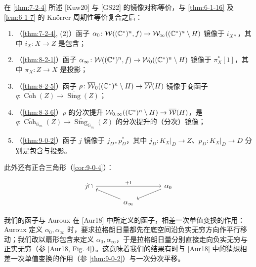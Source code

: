 \begin{thmstar}
在 \ref{thm:7-2-4} 所述 [Kuw20] 与 [GS22] 的镜像对称等价，与 \ref{thm:6-1-16} 及 \ref{lem:6-1-7} 的 Kn{\"o}rrer 周期性等价复合之后：
\begin{enumerate}
\item （\ref{thm:7-2-4}, (2)）函子 $\alpha_0\colon\mathcal{W}((\mathbb{C}^*)^n,f)\to\mathcal{W}_\infty((\mathbb{C}^*)^n\setminus H)$ 镜像于 $i_{X*}$，其中 $i_X\colon X\to Z$ 是包含；
\item （\ref{thm:8-2-1}）函子 $\alpha_\infty\colon\mathcal{W}((\mathbb{C}^*)^n,f)\to\mathcal{W}_0((\mathbb{C}^*)^n\setminus H)$ 镜像于 $\pi_X^*[1]$，其中 $\pi_X\colon Z\to X$ 是投影；
\item （\ref{thm:8-2-5}）函子 $\rho\colon\overline{\mathcal{W}}_0((\mathbb{C}^*)^n\setminus H)\to\overline{\mathcal{W}}(H)$ 镜像于商函子 $q\colon\overline{\operatorname{Coh}}(Z)\to\overline{\operatorname{Sing}}(Z)$；
\item （\ref{thm:8-3-6}）$\rho$ 的分次提升 $\mathcal{W}_{0,\infty}((\mathbb{C}^*)^n\setminus H)\to\overline{\mathcal{W}}(H)$，是 $q\colon\overline{\operatorname{Coh}}_{\mathbb G_m}(Z)\to\overline{\operatorname{Sing}}_{\mathbb G_m}(Z)$ 的分次提升的（分次）镜像；
\item （\ref{thm:9-0-2}）函子 $j$ 镜像于 $j_{D*}p_D^*$，其中 $j_D\colon K_X|_D\to Z$、$p_D\colon K_X|_D\to D$ 分别是包含与投影。
\end{enumerate}
此外还有正合三角形（\ref{cor:9-0-4}）：

\[
\begin{tikzcd}[row sep=1.0em, column sep=3.6em]
{j\cap} \arrow[rr,"+1"] & & \alpha_0 \arrow[dl] \\
& \alpha_\infty \arrow[ul] &
\end{tikzcd}
\]
\end{thmstar}



\begin{remarkx}\label{rem:aur-monodromy}
我们的函子与 Auroux 在 [Aur18] 中所定义的函子，相差一次单值变换的作用：Auroux 定义 $\alpha_0,\alpha_\infty$ 时，要求拉格朗日量都先在底空间沿负实无穷方向作平行移动；我们改以扇形包含来定义 $\alpha_0,\alpha_\infty$，于是拉格朗日量分别直接走向负实无穷与正实无穷（参 [Aur18, Fig. 4]）。这意味着我们的结果有时与 [Aur18] 中的猜想相差一次单值变换的作用（参 \ref{thm:9-0-2}）与一次分次平移。
\end{remarkx}

